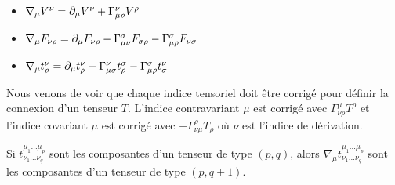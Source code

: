 \documentclass[a4paper,11pt]{report}
\begin{document}
                \begin{exmp}${}$
                    \begin{itemize}[label = \textbullet]
                        \item $\nabla_\mu V^\nu = \partial_\mu V^\nu + \Gamma^\nu_{\mu\rho} V^\rho$
                        \item $\nabla_\mu F_{\nu\rho} = \partial_\mu F_{\nu\rho}-\Gamma^\sigma_{\mu\nu}F_{\sigma\rho}-\Gamma^{\sigma}_{\mu\rho}F_{\nu\sigma}$
                        \item $\nabla_\mu t^\nu_\rho = \partial_\mu t^\nu_\rho+\Gamma^\nu_{\mu\sigma}t^\sigma_\rho - \Gamma^\sigma_{\mu\rho}t^\nu_\sigma$
                    \end{itemize}
                    Nous venons de voir que chaque indice tensoriel doit être corrigé pour définir la connexion d'un tenseur $T$. L'indice contravariant $\mu$ est corrigé avec $\Gamma^\mu_{\nu\rho}T^\rho$ et l'indice covariant $\mu$ est corrigé avec $-\Gamma^\rho_{\nu\mu}T_\rho$ où $\nu$ est l'indice de dérivation.
                \end{exmp}
                
                \begin{thm}\begin{leftbar}
                    Si $t^{\mu_1\dots\mu_p}_{\nu_1\dots\nu_q}$ sont les composantes d'un tenseur de type $(p,q)$, alors $\nabla_\mu t^{\mu_1\dots\mu_p}_{\nu_1\dots\nu_q}$ sont les composantes d'un tenseur de type $(p,q+1)$.
                \end{leftbar}\end{thm}
                
\end{document}

